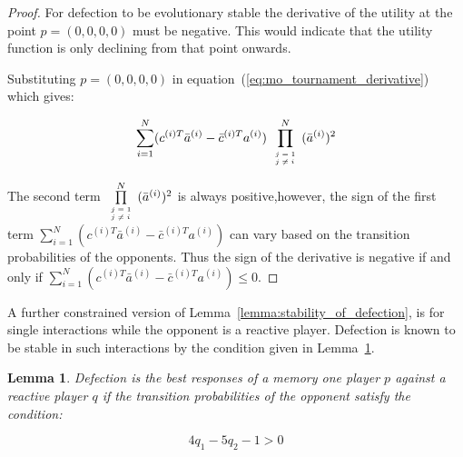 \documentclass[10pt]{article}
\newtheorem{lemma}[theorem]{Lemma}
\begin{document}
\begin{proof}
    For defection to be evolutionary stable the derivative of the utility
    at the point \(p = (0, 0, 0, 0)\) must be negative. This would indicate that
    the utility function is only declining from that point onwards.

    Substituting \(p = (0, 0, 0, 0)\) in
    equation~(\ref{eq:mo_tournament_derivative}) which gives:

    \begin{equation}
    \sum_{i=1} ^ N (c^{(i)T} \bar{a}^{(i)} - \bar{c}^{(i)T} a^{(i)})
    \prod\limits_{\tiny\begin{array}{l} j=1 \\ j \neq i \end{array}} ^ N (\bar{a}^{(i)})^2
    \end{equation}
    
    The second term \(\prod\limits_{\tiny\begin{array}{l} j=1 \\ j \neq i
    \end{array}} ^ N (\bar{a}^{(i)})^2\) is always positive,however, the sign of the
    first term \(\sum_{i=1} ^ N (c^{(i)T} \bar{a}^{(i)} - \bar{c}^{(i)T} a^{(i)})\)
    can vary based on the transition probabilities of the opponents. Thus the
    sign of the derivative is negative if and only if
    \(\sum_{i=1} ^ N (c^{(i)T} \bar{a}^{(i)} - \bar{c}^{(i)T} a^{(i)}) \leq 0\).
\end{proof}

A further constrained version of Lemma~\ref{lemma:stability_of_defection}, is
for single interactions while the opponent is a reactive player. Defection is
known to be stable in such interactions by the condition given in
Lemma~\ref{lemma:stability_of_defection_reactive}.

\begin{lemma}\label{lemma:stability_of_defection_reactive}
    Defection is the best responses of a memory one player \(p\) against a reactive
    player \(q\) if the transition probabilities of the opponent satisfy the
    condition:
    
    \begin{equation}
        4 q_{1} - 5 q_{2} - 1 > 0
    \end{equation}
    \end{lemma}
\end{document}
